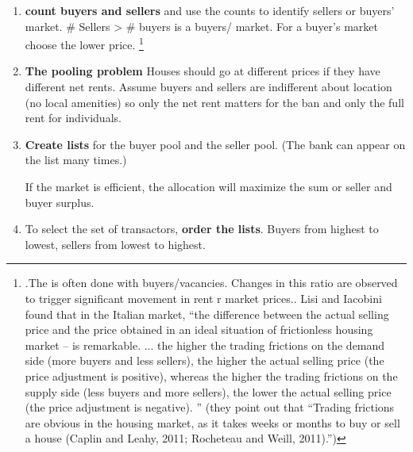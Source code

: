 {\begin{enumerate}
\item \textbf{count buyers and sellers} and use the counts to identify sellers or buyers' market. \# Sellers > \# buyers is a buyers/ market. For a buyer's market  choose the lower price. \footnote{.The is often done with buyers/vacancies. Changes in this ratio are observed to trigger significant movement in rent r market prices.\cite{wheatonVacancySearchPrices1990}. Lisi and Iacobini \cite{lisiEstimatingHousingPrice2015} found  that in the Italian market, ``the difference between the actual selling price and the price obtained in an ideal situation of frictionless housing market – is remarkable. ... the higher the trading frictions on the demand side (more buyers and less sellers), the higher the actual selling price (the price adjustment is positive), whereas the higher the trading frictions on the supply side (less buyers and more sellers), the lower the actual selling price (the price adjustment is negative). '' (they point out that ``Trading frictions are obvious in the housing market, as it takes weeks or months to buy or sell a house (Caplin and Leahy, 2011; Rocheteau and Weill, 2011).'')}  

\item \textbf{The pooling problem}  Houses should go at different prices if they have different net rents.  Assume buyers and sellers are indifferent about location (no  local amenities) so only the net rent matters for the ban and only the full rent for individuals.

\item \textbf{Create lists} for the buyer pool and the seller pool. (The bank can appear on the list many times.) 

If the market is efficient, the allocation will maximize the sum or seller and buyer surplus.

\item To select the set of transactors, \textbf{order the lists}. Buyers from highest to lowest, sellers from lowest to highest.

\end{enumerate}


}
